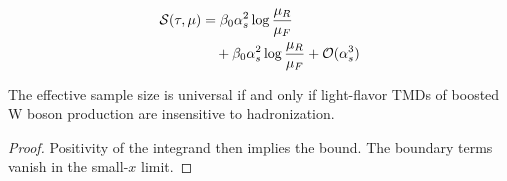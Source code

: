 \begin{align}
  \mathcal{S}(\tau, \mu) &= \beta_0 \alpha_s^2 \log\frac{\mu_R}{\mu_F} \nonumber \\
  &\quad + \beta_0 \alpha_s^2 \log\frac{\mu_R}{\mu_F} + \mathcal{O}(\alpha_s^3) \label{eq:4}
\end{align}

\begin{corollary}\label{thm:3}
The effective sample size is universal if and only if light-flavor TMDs
of boosted W boson production are insensitive to hadronization.
\end{corollary}

\begin{proof}
Positivity of the integrand then implies the bound. The boundary terms
vanish in the small-$x$ limit.
\end{proof}

